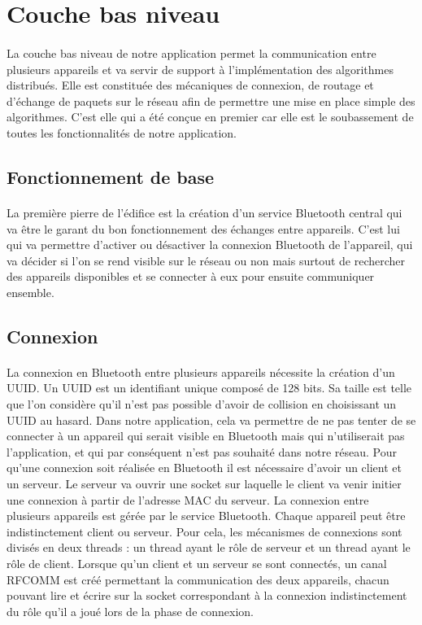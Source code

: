 \documentclass[a4paper,10pt]{report}
\begin{document}
  \section{Couche bas niveau}
    \paragraph{}
    La couche bas niveau de notre application permet la communication entre plusieurs appareils et va servir de support à l'implémentation des algorithmes distribués. Elle est constituée des mécaniques de connexion, de routage et d'échange de paquets sur le réseau afin de permettre une mise en place simple des algorithmes. C'est elle qui a été conçue en premier car elle est le soubassement de toutes les fonctionnalités de notre application.
  
    \subsection{Fonctionnement de base}
    \paragraph{}
    La première pierre de l'édifice est la création d'un service Bluetooth central qui va être le garant du bon fonctionnement des échanges entre appareils. C'est lui qui va permettre d'activer ou désactiver la connexion Bluetooth de l'appareil, qui va décider si l'on se rend visible sur le réseau ou non mais surtout de rechercher des appareils disponibles et se connecter à eux pour ensuite communiquer ensemble.
    
    \subsection{Connexion}
    \paragraph{}
    La connexion en Bluetooth entre plusieurs appareils nécessite la création d'un UUID. Un UUID est un identifiant unique composé de 128 bits. Sa taille est telle que l'on considère qu'il n'est pas possible d'avoir de collision en choisissant un UUID au hasard. Dans notre application, cela va permettre de ne pas tenter de se connecter à un appareil qui serait visible en Bluetooth mais qui n'utiliserait pas l'application, et qui par conséquent n'est pas souhaité dans notre réseau.
    Pour qu'une connexion soit réalisée en Bluetooth il est nécessaire d'avoir un client et un serveur. Le serveur va ouvrir une socket sur laquelle le client va venir initier une connexion à partir de l'adresse MAC du serveur.
    La connexion entre plusieurs appareils est gérée par le service Bluetooth. Chaque appareil peut être indistinctement client ou serveur. Pour cela, les mécanismes de connexions sont divisés en deux threads : un thread ayant le rôle de serveur et un thread ayant le rôle de client.
    Lorsque qu'un client et un serveur se sont connectés, un canal RFCOMM est créé permettant la communication des deux appareils, chacun pouvant lire et écrire sur la socket correspondant à la connexion indistinctement du rôle qu'il a joué lors de la phase de connexion.
    
\end{document}
